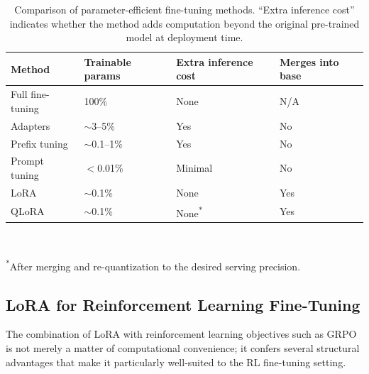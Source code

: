 \begin{table}[t]
  \centering
  \caption{Comparison of parameter-efficient fine-tuning methods.
           ``Extra inference cost'' indicates whether the method adds
           computation beyond the original pre-trained model at
           deployment time.}
  \label{tab:peft-comparison}
  \small
  \begin{tabular}{@{}p{}p{}p{}p{}@{}}
    \toprule
    \textbf{Method} & \textbf{Trainable params} & \textbf{Extra inference cost}
      & \textbf{Merges into base} \\
    \midrule
    Full fine-tuning              & 100\%          & None       & N/A \\
    Adapters \citep{houlsby2019adapters}
                                  & $\sim$3--5\%   & Yes        & No \\
    Prefix tuning \citep{li2021prefix}
                                  & $\sim$0.1--1\% & Yes        & No \\
    Prompt tuning \citep{lester2021prompt}
                                  & $<$0.01\%      & Minimal    & No \\
    LoRA \citep{hu2021lora}       & $\sim$0.1\%    & None       & Yes \\
    QLoRA \citep{dettmers2023qlora}
                                  & $\sim$0.1\%    & None\textsuperscript{*}
                                                                & Yes \\
    \bottomrule
  \end{tabular}
  \\[4pt]
  \raggedright
  \footnotesize\textsuperscript{*}After merging and re-quantization to
  the desired serving precision.
\end{table}

\subsection{LoRA for Reinforcement Learning Fine-Tuning}
\label{sec:lora-rl}

The combination of LoRA with reinforcement learning objectives such as
GRPO is not merely a matter of computational convenience; it confers
several structural advantages that make it particularly well-suited to
the RL fine-tuning setting.


